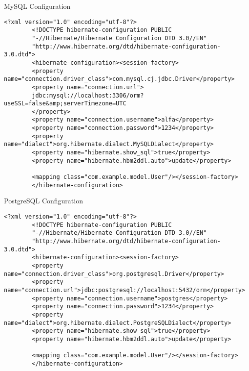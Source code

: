\documentclass[aspectratio=169, table]{beamer}
\begin{document}
\begin{frame}[fragile]{MySQL Configuration}
	\vspace{20pt}
	\begin{lstlisting}[style=XmlStyle]
		<?xml version="1.0" encoding="utf-8"?>
		<!DOCTYPE hibernate-configuration PUBLIC 
		"-//Hibernate/Hibernate Configuration DTD 3.0//EN"
		"http://www.hibernate.org/dtd/hibernate-configuration-3.0.dtd">
		<hibernate-configuration><session-factory>
		<property name="connection.driver_class">com.mysql.cj.jdbc.Driver</property>
		<property name="connection.url">
		jdbc:mysql://localhost:3306/orm?useSSL=false&amp;serverTimezone=UTC
		</property>
		<property name="connection.username">alfa</property>
		<property name="connection.password">1234</property>
		<property name="dialect">org.hibernate.dialect.MySQLDialect</property>
		<property name="hibernate.show_sql">true</property>
		<property name="hibernate.hbm2ddl.auto">update</property>
		
		<mapping class="com.example.model.User"/></session-factory>
		</hibernate-configuration>
	\end{lstlisting}
\end{frame}

\begin{frame}[fragile]{PostgreSQL Configuration}
	\vspace{20pt}
	\begin{lstlisting}[style=XmlStyle]
		<?xml version="1.0" encoding="utf-8"?>
		<!DOCTYPE hibernate-configuration PUBLIC 
		"-//Hibernate/Hibernate Configuration DTD 3.0//EN"
		"http://www.hibernate.org/dtd/hibernate-configuration-3.0.dtd">
		<hibernate-configuration><session-factory>
		<property name="connection.driver_class">org.postgresql.Driver</property>
		<property name="connection.url">jdbc:postgresql://localhost:5432/orm</property>
		<property name="connection.username">postgres</property>
		<property name="connection.password">1234</property>
		<property name="dialect">org.hibernate.dialect.PostgreSQLDialect</property>
		<property name="hibernate.show_sql">true</property>
		<property name="hibernate.hbm2ddl.auto">update</property>
		
		<mapping class="com.example.model.User"/></session-factory>
		</hibernate-configuration>
	\end{lstlisting}
\end{frame}
\end{document}
